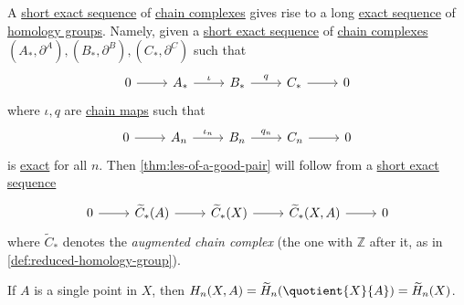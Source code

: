 \begin{remark}
	A \hyperref[def:short-exact-sequence]{short exact sequence} of \hyperref[def:chain-complex]{chain complexes} gives rise to a
	long \hyperref[def:exact-sequence]{exact sequence} of \hyperref[def:homology-group]{homology groups}. Namely, given a
	\hyperref[def:short-exact-sequence]{short exact sequence} of \hyperref[def:chain-complex]{chain complexes}
	\((A_\ast, \partial^A), (B_\ast, \partial^B), (C_\ast, \partial^C)\) such that
	\[
		\begin{tikzcd}
			0 & {A_\ast} & {B_\ast} & {C_\ast} & 0
			\arrow[from=1-1, to=1-2]
			\arrow["\iota", from=1-2, to=1-3]
			\arrow["q", from=1-3, to=1-4]
			\arrow[from=1-4, to=1-5]
		\end{tikzcd}
	\]
	where \(\iota , q\) are \hyperref[def:chain-map]{chain maps} such that
	\[
		\begin{tikzcd}
			0 & {A_n} & {B_n} & {C_n} & 0
			\arrow[from=1-1, to=1-2]
			\arrow["\iota_{n}", from=1-2, to=1-3]
			\arrow["q_{n}", from=1-3, to=1-4]
			\arrow[from=1-4, to=1-5]
		\end{tikzcd}
	\]
	is \hyperref[def:exact]{exact} for all \(n\).
	Then \autoref{thm:les-of-a-good-pair} will
	follow from a \hyperref[def:short-exact-sequence]{short exact sequence}
	\[
		\begin{tikzcd}
			0 & {\widetilde{C}_\ast(A)} & {\widetilde{C}_\ast(X)} & {\widetilde{C}_\ast(X, A)} & 0
			\arrow[from=1-1, to=1-2]
			\arrow[from=1-2, to=1-3]
			\arrow[from=1-3, to=1-4]
			\arrow[from=1-4, to=1-5]
		\end{tikzcd}
	\]
	where \(\widetilde{C}_\ast\) denotes the \emph{augmented chain complex} (the one with \(\mathbb{Z}\) after it, as in \autoref{def:reduced-homology-group}).
\end{remark}

\begin{exercise}
	If \(A\) is a single point in \(X\), then \(H_n(X, A) = \widetilde{H}_n(\quotient{X}{A}) = \widetilde{H}_n(X)\).
\end{exercise}